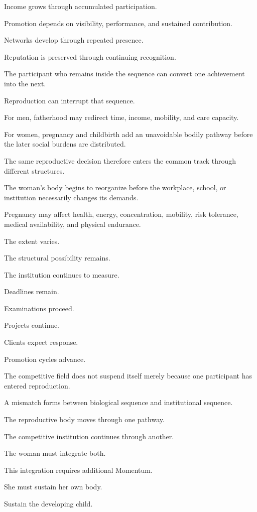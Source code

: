 Income grows through accumulated participation.

Promotion depends on visibility, performance, and sustained contribution.

Networks develop through repeated presence.

Reputation is preserved through continuing recognition.

The participant who remains inside the sequence can convert one achievement into the next.

Reproduction can interrupt that sequence.

For men, fatherhood may redirect time, income, mobility, and care capacity.

For women, pregnancy and childbirth add an unavoidable bodily pathway before the later social burdens are distributed.

The same reproductive decision therefore enters the common track through different structures.

The woman’s body begins to reorganize before the workplace, school, or institution necessarily changes its demands.

Pregnancy may affect health, energy, concentration, mobility, risk tolerance, medical availability, and physical endurance.

The extent varies.

The structural possibility remains.

The institution continues to measure.

Deadlines remain.

Examinations proceed.

Projects continue.

Clients expect response.

Promotion cycles advance.

The competitive field does not suspend itself merely because one participant has entered reproduction.

A mismatch forms between biological sequence and institutional sequence.

The reproductive body moves through one pathway.

The competitive institution continues through another.

The woman must integrate both.

This integration requires additional Momentum.

She must sustain her own body.

Sustain the developing child.

